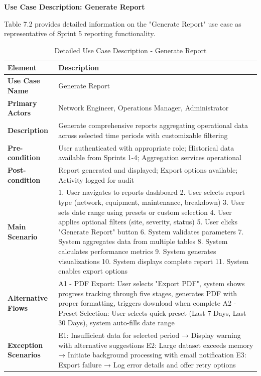 \textbf{Use Case Description: Generate Report}

Table 7.2 provides detailed information on the "Generate Report" use case as representative of Sprint 5 reporting functionality.

\begin{table}[H]
\centering
\small
\begin{tabular}{|p{3cm}|p{8.5cm}|}
\hline
\textbf{Element} & \textbf{Description} \\
\hline
\textbf{Use Case Name} & Generate Report \\
\hline
\textbf{Primary Actors} & Network Engineer, Operations Manager, Administrator \\
\hline
\textbf{Description} & Generate comprehensive reports aggregating operational data across selected time periods with customizable filtering \\
\hline
\textbf{Pre-condition} & User authenticated with appropriate role; Historical data available from Sprints 1-4; Aggregation services operational \\
\hline
\textbf{Post-condition} & Report generated and displayed; Export options available; Activity logged for audit \\
\hline
\textbf{Main Scenario} & 
1. User navigates to reports dashboard
2. User selects report type (network, equipment, maintenance, breakdown)
3. User sets date range using presets or custom selection
4. User applies optional filters (site, severity, status)
5. User clicks "Generate Report" button
6. System validates parameters
7. System aggregates data from multiple tables
8. System calculates performance metrics
9. System generates visualizations
10. System displays complete report
11. System enables export options
\\
\hline
\textbf{Alternative Flows} & 
A1 - PDF Export: User selects "Export PDF", system shows progress tracking through five stages, generates PDF with proper formatting, triggers download when complete
A2 - Preset Selection: User selects quick preset (Last 7 Days, Last 30 Days), system auto-fills date range
\\
\hline
\textbf{Exception Scenarios} & 
E1: Insufficient data for selected period → Display warning with alternative suggestions
E2: Large dataset exceeds memory → Initiate background processing with email notification
E3: Export failure → Log error details and offer retry options
\\
\hline
\end{tabular}
\caption{Detailed Use Case Description - Generate Report}
\label{tab:generate_report_usecase}
\end{table}

